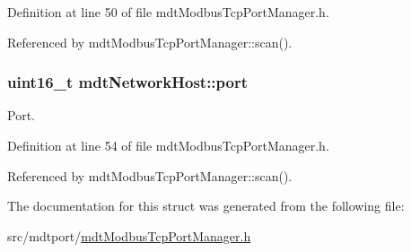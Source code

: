 Definition at line 50 of file mdt\-Modbus\-Tcp\-Port\-Manager.\-h.



Referenced by mdt\-Modbus\-Tcp\-Port\-Manager\-::scan().

\hypertarget{structmdt_network_host_aa6c1fee525513ea51948add0c1d05034}{
\subsubsection[{port}]{\setlength{\rightskip}{0pt plus 5cm}uint16\-\_\-t mdt\-Network\-Host\-::port}}\label{structmdt_network_host_aa6c1fee525513ea51948add0c1d05034}


Port. 



Definition at line 54 of file mdt\-Modbus\-Tcp\-Port\-Manager.\-h.



Referenced by mdt\-Modbus\-Tcp\-Port\-Manager\-::scan().



The documentation for this struct was generated from the following file\-:\begin{DoxyCompactItemize}
\item 
src/mdtport/\hyperlink{mdt_modbus_tcp_port_manager_8h}{mdt\-Modbus\-Tcp\-Port\-Manager.\-h}\end{DoxyCompactItemize}
